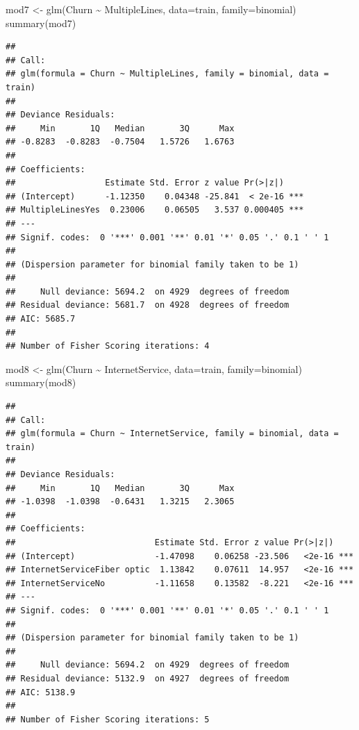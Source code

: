 \documentclass[
  twoside]{article}
\newenvironment{Shaded}{\begin{snugshade}}{\end{snugshade}}
\newcommand{\AttributeTok}[1]{\textcolor[rgb]{0.77,0.63,0.00}{#1}}
\newcommand{\FunctionTok}[1]{\textcolor[rgb]{0.00,0.00,0.00}{#1}}
\newcommand{\NormalTok}[1]{#1}
\newcommand{\OtherTok}[1]{\textcolor[rgb]{0.56,0.35,0.01}{#1}}
\newcommand{\SpecialCharTok}[1]{\textcolor[rgb]{0.00,0.00,0.00}{#1}}
\begin{document}
\begin{Shaded}
\begin{Highlighting}[]
\NormalTok{mod7 }\OtherTok{\textless{}{-}} \FunctionTok{glm}\NormalTok{(Churn }\SpecialCharTok{\textasciitilde{}}\NormalTok{ MultipleLines, }\AttributeTok{data=}\NormalTok{train, }\AttributeTok{family=}\NormalTok{binomial)}
\FunctionTok{summary}\NormalTok{(mod7)}
\end{Highlighting}
\end{Shaded}

\begin{verbatim}
## 
## Call:
## glm(formula = Churn ~ MultipleLines, family = binomial, data = train)
## 
## Deviance Residuals: 
##     Min       1Q   Median       3Q      Max  
## -0.8283  -0.8283  -0.7504   1.5726   1.6763  
## 
## Coefficients:
##                  Estimate Std. Error z value Pr(>|z|)    
## (Intercept)      -1.12350    0.04348 -25.841  < 2e-16 ***
## MultipleLinesYes  0.23006    0.06505   3.537 0.000405 ***
## ---
## Signif. codes:  0 '***' 0.001 '**' 0.01 '*' 0.05 '.' 0.1 ' ' 1
## 
## (Dispersion parameter for binomial family taken to be 1)
## 
##     Null deviance: 5694.2  on 4929  degrees of freedom
## Residual deviance: 5681.7  on 4928  degrees of freedom
## AIC: 5685.7
## 
## Number of Fisher Scoring iterations: 4
\end{verbatim}

\begin{Shaded}
\begin{Highlighting}[]
\NormalTok{mod8 }\OtherTok{\textless{}{-}} \FunctionTok{glm}\NormalTok{(Churn }\SpecialCharTok{\textasciitilde{}}\NormalTok{ InternetService, }\AttributeTok{data=}\NormalTok{train, }\AttributeTok{family=}\NormalTok{binomial)}
\FunctionTok{summary}\NormalTok{(mod8)}
\end{Highlighting}
\end{Shaded}

\begin{verbatim}
## 
## Call:
## glm(formula = Churn ~ InternetService, family = binomial, data = train)
## 
## Deviance Residuals: 
##     Min       1Q   Median       3Q      Max  
## -1.0398  -1.0398  -0.6431   1.3215   2.3065  
## 
## Coefficients:
##                            Estimate Std. Error z value Pr(>|z|)    
## (Intercept)                -1.47098    0.06258 -23.506   <2e-16 ***
## InternetServiceFiber optic  1.13842    0.07611  14.957   <2e-16 ***
## InternetServiceNo          -1.11658    0.13582  -8.221   <2e-16 ***
## ---
## Signif. codes:  0 '***' 0.001 '**' 0.01 '*' 0.05 '.' 0.1 ' ' 1
## 
## (Dispersion parameter for binomial family taken to be 1)
## 
##     Null deviance: 5694.2  on 4929  degrees of freedom
## Residual deviance: 5132.9  on 4927  degrees of freedom
## AIC: 5138.9
## 
## Number of Fisher Scoring iterations: 5
\end{verbatim}
\end{document}
